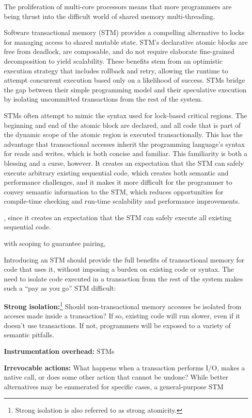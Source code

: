 The proliferation of multi-core processors means that more programmers are
being thrust into the difficult world of shared memory multi-threading.

Software transactional memory (STM) provides a compelling alternative to
locks for managing access to shared mutable state.  STM's declarative
atomic blocks are free from deadlock, are composable, and do not
require elaborate fine-grained decomposition to yield scalability.
These benefits stem from an optimistic execution strategy that includes
rollback and retry, allowing the runtime to attempt concurrent execution
based only on a likelihood of success.  STMs bridge the gap between their
simple programming model and their speculative execution by isolating
uncommitted transactions from the rest of the system.

STMs often attempt to mimic the syntax used for lock-based critical
regions.  The beginning and end of the atomic block are declared, and all
code that is part of the dynamic scope of the atomic region is executed
transactionally.  This has the advantage that transactional accesses
inherit the programming language's syntax for reads and writes, which
is both concise and familiar.  This familiarity is both a blessing and
a curse, however.  It creates an expectation that the STM can safely
execute arbitrary existing sequential code, which creates both semantic
and performance challenges, and it makes it more difficult for the
programmer to convey semantic information to the STM, which reduces
opportunities for compile-time checking and run-time scalability and
performance improvements.

, since it creates an expectation that the STM can
safely execute all existing sequential code.

with scoping to
guarantee pairing, 

Introducing
an STM should provide the full benefits of transactional memory for
code that uses it, without imposing a burden on existing code or syntax.
The need to isolate code executed in a transaction from the rest of the system
makes such a ``pay as you go'' STM difficult:
\begin{packed_itemize}

\item \textbf{Strong isolation:}\footnote{Strong isolation is also 
referred to as strong atomicity.} Should non-transactional memory accesses be isolated from
acceses made inside a transaction?  If so, existing code will run slower, even
if it doesn't use transactions.  If not, programmers will be exposed to a
variety of semantic pitfalls.

\item \textbf{Instrumentation overhead:} STMs 

\item \textbf{Irrevocable actions:} What happens when a transaction performs
I/O, makes a native call, or does some other action that cannot be undone?
While better alternatives may be enumerated for specific cases, a
general-purpose STM 

\item 

\end{packed_itemize}

